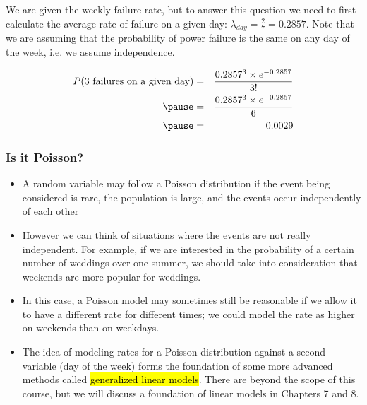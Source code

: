 
\begin{frame}


\pause

We are given the weekly failure rate, but to answer this question we need to first calculate the average rate of failure on a given day: $\lambda_{day} = \frac{2}{7} = 0.2857$. Note that we are assuming that the probability of power failure is the same on any day of the week, i.e. we assume independence.

\pause

\begin{eqnarray*}
P(\text{3 failures on a given day}) &=& \frac{0.2857^3 \times e^{-0.2857}}{3!} \\
\pause
&=& \frac{0.2857^3 \times e^{-0.2857}}{6} \\
\pause
&=& 0.0029
\end{eqnarray*}

\end{frame}


\begin{frame}
\frametitle{Is it Poisson?}

\begin{itemize}

\item A random variable may follow a Poisson distribution if the event being considered is rare, the population is large, and the events occur independently of each other

\item However we can think of situations where the events are not really independent. For example, if we are interested in the probability of a certain number of weddings over one summer, we should take into consideration that weekends are more popular for weddings.

\item In this case, a Poisson model may sometimes still be reasonable if we allow it to have a different rate for different times; we could model the rate as higher on weekends than on weekdays.

\item The idea of modeling rates for a Poisson distribution against a second variable (day of the week) forms the
foundation of some more advanced methods called \hl{generalized linear models}. There are beyond the scope of this course, but we will discuss a foundation of linear models in Chapters 7 and 8.

\end{itemize}

\end{frame}

